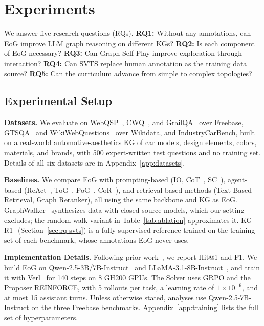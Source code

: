 \section{Experiments}
\label{sec:experiments}

We answer five research questions (RQs). \textbf{RQ1:} Without any annotations, can EoG improve LLM graph reasoning on different KGs? \textbf{RQ2:} Is each component of EoG necessary? \textbf{RQ3:} Can Graph Self-Play improve exploration through interaction? \textbf{RQ4:} Can SVTS replace human annotation as the training data source? \textbf{RQ5:} Can the curriculum advance from simple to complex topologies?

\subsection{Experimental Setup}

\textbf{Datasets.} We evaluate on WebQSP~\citep{webqsp}, CWQ~\citep{cwq}, and GrailQA~\citep{grailqa} over Freebase, GTSQA~\citep{GTSQA} and WikiWebQuestions~\citep{wikiwebquestions} over Wikidata, and IndustryCarBench, built on a real-world automotive-aesthetics KG of car models, design elements, colors, materials, and brands, with 500 expert-written test questions and no training set. Details of all six datasets are in Appendix~\ref{app:datasets}.

\textbf{Baselines.} We compare EoG with prompting-based (IO, CoT~\citep{CoT}, SC~\citep{Self-Consistency}), agent-based (ReAct~\citep{React}, ToG~\citep{ToG}, PoG~\citep{PoG}, CoR~\citep{CoR}), and retrieval-based methods (Text-Based Retrieval, Graph Reranker), all using the same backbone and KG as EoG. GraphWalker~\citep{GraphWalker} synthesizes data with closed-source models, which our setting excludes; the random-walk variant in Table~\ref{tab:ablation} approximates it. KG-R1$^\dagger$ (Section~\ref{sec:rq-svts}) is a fully supervised reference trained on the training set of each benchmark, whose annotations EoG never uses.

\textbf{Implementation Details.} Following prior work~\citep{ToG,KG-R1}, we report Hit@1 and F1. We build EoG on Qwen-2.5-3B/7B-Instruct~\citep{qwen25} and LLaMA-3.1-8B-Instruct~\citep{llama3}, and train it with Verl~\citep{sheng2025hybridflow} for 140 steps on 8 GH200 GPUs. The Solver uses GRPO and the Proposer REINFORCE, with 5 rollouts per task, a learning rate of $1\times10^{-6}$, and at most 15 assistant turns. Unless otherwise stated, analyses use Qwen-2.5-7B-Instruct on the three Freebase benchmarks. Appendix~\ref{app:training} lists the full set of hyperparameters.

